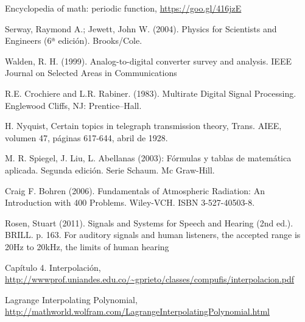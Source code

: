 \documentclass[comsoc, journal]{IEEEtran}
\begin{document}
\ifCLASSOPTIONcaptionsoff
  \newpage
\fi

\begin{thebibliography}{1}

Encyclopedia of math: periodic function,
\url{https://goo.gl/416jzE}

Serway, Raymond A.; Jewett, John W. (2004). Physics for Scientists and Engineers (6ª edición). Brooks/Cole.

Walden, R. H. (1999). Analog-to-digital converter survey and analysis. IEEE Journal on Selected Areas in Communications

R.E. Crochiere and L.R. Rabiner. (1983). Multirate Digital Signal Processing. Englewood Cliffs, NJ: Prentice–Hall.

H. Nyquist, Certain topics in telegraph transmission theory, Trans. AIEE, volumen 47, páginas 617-644, abril de 1928.

M. R. Spiegel, J. Liu, L. Abellanas (2003): Fórmulas y tablas de matemática aplicada. Segunda edición. Serie Schaum. Mc Graw-Hill.

Craig F. Bohren (2006). Fundamentals of Atmospheric Radiation: An Introduction with 400 Problems. Wiley-VCH. ISBN 3-527-40503-8.

Rosen, Stuart (2011). Signals and Systems for Speech and Hearing (2nd ed.). BRILL. p. 163. For auditory signals and human listeners, the accepted range is 20Hz to 20kHz, the limits of human hearing

Capítulo 4. Interpolación,
\url{http://wwwprof.uniandes.edu.co/~gprieto/classes/compufis/interpolacion.pdf}

Lagrange Interpolating Polynomial,
\url{http://mathworld.wolfram.com/LagrangeInterpolatingPolynomial.html}

\end{thebibliography}
\end{document}
